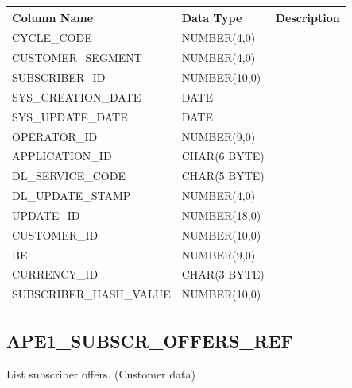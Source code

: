 \documentclass[12pt,twoside]{article}
\begin{document}
\begin{center}
\begin{tabular}{lll}
\hline
 \textbf{Column Name}     &  \textbf{Data Type}  &  \textbf{Description}  \\
\hline
 CYCLE\_CODE              &  NUMBER(4,0)         &                        \\
 CUSTOMER\_SEGMENT        &  NUMBER(4,0)         &                        \\
 SUBSCRIBER\_ID           &  NUMBER(10,0)        &                        \\
 SYS\_CREATION\_DATE      &  DATE                &                        \\
 SYS\_UPDATE\_DATE        &  DATE                &                        \\
 OPERATOR\_ID             &  NUMBER(9,0)         &                        \\
 APPLICATION\_ID          &  CHAR(6 BYTE)        &                        \\
 DL\_SERVICE\_CODE        &  CHAR(5 BYTE)        &                        \\
 DL\_UPDATE\_STAMP        &  NUMBER(4,0)         &                        \\
 UPDATE\_ID               &  NUMBER(18,0)        &                        \\
 CUSTOMER\_ID             &  NUMBER(10,0)        &                        \\
 BE                       &  NUMBER(9,0)         &                        \\
 CURRENCY\_ID             &  CHAR(3 BYTE)        &                        \\
 SUBSCRIBER\_HASH\_VALUE  &  NUMBER(10,0)        &                        \\
\hline
\end{tabular}
\end{center}


\normalsize
\subsection{APE1\_SUBSCR\_OFFERS\_REF}
\label{sec-9-5}

   List subscriber offers. (Customer data)
\scriptsize
\end{document}
